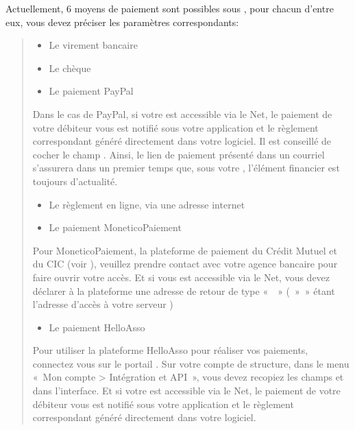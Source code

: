 \documentclass[a4paper,10pt,oneside,french]{sphinxmanual}
\begin{document}
\sphinxAtStartPar
Actuellement, 6 moyens de paiement sont possibles sous , pour chacun d’entre eux, vous devez préciser les paramètres correspondants:
\begin{quote}
\begin{itemize}
\item {} 
\sphinxAtStartPar
Le virement bancaire

\item {} 
\sphinxAtStartPar
Le chèque

\item {} 
\sphinxAtStartPar
Le paiement PayPal

\end{itemize}

\sphinxAtStartPar
Dans le cas de PayPal, si votre  est accessible via le Net, le paiement de votre débiteur vous est notifié sous votre application et le règlement correspondant généré directement dans votre logiciel.
Il est conseillé de cocher le champ . Ainsi, le lien de paiement présenté dans un courriel s’assurera dans un premier temps que, sous votre , l’élément financier est toujours d’actualité.
\begin{itemize}
\item {} 
\sphinxAtStartPar
Le règlement en ligne, via une adresse internet

\item {} 
\sphinxAtStartPar
Le paiement MoneticoPaiement

\end{itemize}

\sphinxAtStartPar
Pour MoneticoPaiement, la plateforme de paiement du Crédit Mutuel et du CIC (voir ), veuillez prendre contact avec votre agence bancaire pour faire ouvrir votre accès.
Et si vous  est accessible via le Net, vous devez déclarer à la plateforme une adresse de retour de type «  » ( » » étant l’adresse d’accès à votre serveur )
\begin{itemize}
\item {} 
\sphinxAtStartPar
Le paiement Hello\sphinxhyphen{}Asso

\end{itemize}

\sphinxAtStartPar
Pour utiliser la plateforme Hello\sphinxhyphen{}Asso pour réaliser vos paiements, connectez vous sur le portail .
Sur votre compte de structure, dans le menu « Mon compte \textgreater{} Intégration et API », vous devez recopiez les champs  et  dans l’interface.
Et si votre  est accessible via le Net, le paiement de votre débiteur vous est notifié sous votre application et le règlement correspondant généré directement dans votre logiciel.
\end{quote}
\end{document}
